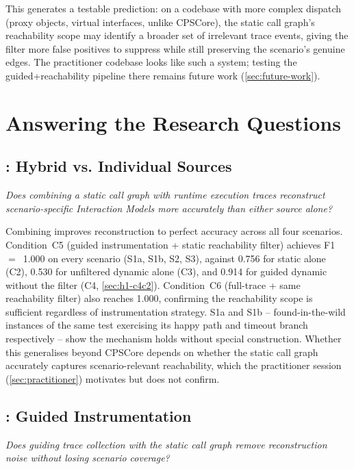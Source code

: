 This generates a testable prediction: on a codebase with more complex
dispatch (proxy objects, virtual interfaces, unlike CPSCore), the static
call graph's reachability scope may identify a broader set of irrelevant
trace events, giving the filter more false positives to suppress while
still preserving the scenario's genuine edges. The practitioner
codebase looks like such a system; testing the guided+reachability
pipeline there remains future work (\cref{sec:future-work}).

\section{Answering the Research Questions}\label{sec:rq-answers}

\subsection*{\rqone: Hybrid vs. Individual Sources}

\textit{Does combining a static call graph with runtime execution traces
reconstruct scenario-specific Interaction Models more accurately than
either source alone?}

Combining improves reconstruction to perfect accuracy across all
four scenarios. Condition~C5 (guided instrumentation + static
reachability filter) achieves F1~$=$~1.000 on every scenario
(S1a, S1b, S2, S3), against 0.756 for static alone (C2), 0.530 for
unfiltered dynamic alone (C3), and 0.914 for guided dynamic without the
filter (C4, \cref{sec:h1-c4c2}). Condition~C6 (full-trace + same
reachability filter) also reaches 1.000, confirming the reachability
scope is sufficient regardless of instrumentation strategy. S1a and
S1b -- found-in-the-wild instances of the same test exercising its
happy path and timeout branch respectively -- show the mechanism holds
without special construction. Whether this generalises beyond CPSCore
depends on whether the static call graph accurately captures
scenario-relevant reachability, which the practitioner session
(\cref{sec:practitioner}) motivates but does not confirm.

\subsection*{\rqtwo: Guided Instrumentation}

\textit{Does guiding trace collection with the static call graph remove
reconstruction noise without losing scenario coverage?}

